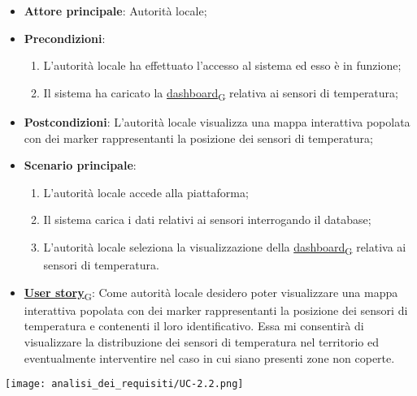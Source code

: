 \begin{itemize}
	\item \textbf{Attore principale}: Autorità locale;
	\item \textbf{Precondizioni}:
	      \begin{enumerate}
		      \item L'autorità locale ha effettuato l'accesso al sistema ed esso è in funzione;
		      \item Il sistema ha caricato la \href{https://7last.github.io/docs/rtb/documentazione-interna/glossario\#dashboard}{dashboard\textsubscript{G}} relativa ai sensori di temperatura;
	      \end{enumerate}
	\item \textbf{Postcondizioni}: L'autorità locale visualizza una mappa interattiva popolata con dei marker rappresentanti la posizione dei sensori di temperatura;
	\item \textbf{Scenario principale}:
	      \begin{enumerate}
		      \item L'autorità locale accede alla piattaforma;
		      \item Il sistema carica i dati relativi ai sensori interrogando il database;
		      \item L'autorità locale seleziona la visualizzazione della \href{https://7last.github.io/docs/rtb/documentazione-interna/glossario\#dashboard}{dashboard\textsubscript{G}} relativa ai sensori di temperatura.
	      \end{enumerate}
	\item \href{https://7last.github.io/docs/rtb/documentazione-interna/glossario\#user-story}{\textbf{User story}\textsubscript{G}}:
	      Come autorità locale desidero poter visualizzare una mappa interattiva popolata con dei marker rappresentanti la posizione dei sensori di temperatura e contenenti il loro identificativo. Essa mi consentirà di visualizzare la distribuzione dei sensori di temperatura nel territorio ed eventualmente interventire nel caso in cui siano presenti zone non coperte.
\end{itemize}
\begin{center}
	\texttt{[image: analisi\_dei\_requisiti/UC-2.2.png]}
\end{center}


